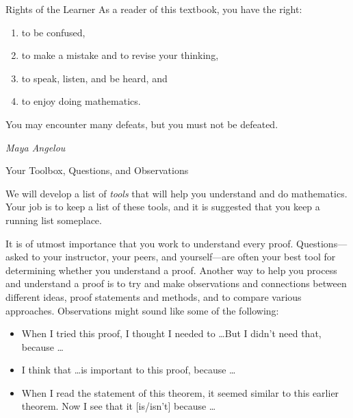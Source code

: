 \begin{section}{Rights of the Learner}\label{sec:Rights of the Learner}
As a reader of this textbook, you have the right:
\begin{enumerate}
\item to be confused,
\item to make a mistake and to revise your thinking,
\item to speak, listen, and be heard, and
\item to enjoy doing mathematics.
\end{enumerate}

\epigraph{You may encounter many defeats, but you must not be defeated.}{\emph{Maya Angelou}}
	
\end{section}

\begin{section}{Your Toolbox, Questions, and Observations}

We will develop a list of \emph{tools} that will help you understand and do mathematics. Your job is to keep a list of these tools, and it is suggested that you keep a running list someplace.

It is of utmost importance that you work to understand every proof.  Questions---asked to your instructor, your peers, and yourself---are often your best tool for determining whether you understand a proof.  
Another way to help you process and understand a proof is to try and make observations and connections between different ideas, proof statements and methods, and to compare various approaches. Observations might sound like some of the following:
\begin{itemize}
\item When I tried this proof, I thought I needed to \ldots But I didn't need that, because \ldots
\item I think that \ldots is important to this proof, because \ldots
\item When I read the statement of this theorem, it seemed similar to this earlier theorem. Now I see that it [is/isn't] because \ldots
\end{itemize}


\end{section}
